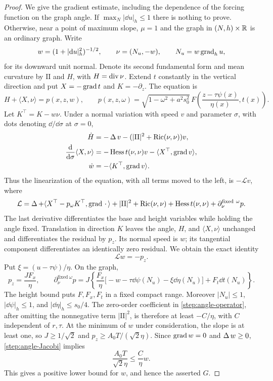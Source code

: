 \begin{proof}
We give the gradient estimate, including the dependence of the forcing function
on the graph angle.  If $\max_N|\dd u|_h\le1$ there is nothing to prove.
Otherwise, near a point of maximum slope, $\mu=1$ and the graph in
$(N,h)\times\mathbb R$ is an ordinary graph.  Write
\[
 w=(1+|\mathrm d u|_h^2)^{-1/2},\qquad
 \nu=(N_u,-w),\qquad N_u=w\operatorname{grad}_hu,
\]
for its downward unit normal.  Denote its second fundamental form and
mean curvature by $\mathrm{II}$ and $H$, with $H=\operatorname{div}\nu$.  Extend
$t$ constantly in the vertical direction and put $X=-\operatorname{grad} t$ and
$K=-\partial_z$.  The equation is
\[
 H+\langle X,\nu\rangle=p(x,z,w),\qquad
 p(x,z,\omega)=\sqrt{1-\omega^2+a^2s_0^2}\,
 F\left(\frac{z-\tau\psi(x)}{\eta(x)},t(x)\right).
\]
Let $K^\top=K-w\nu$.  Under a normal variation with speed $v$ and
parameter $\sigma$, with dots denoting $\dd/\dd\sigma$ at $\sigma=0$,
\begin{align*}
 \dot H&=-\operatorname{\Delta} v-(|\mathrm{II}|^2+\operatorname{Ric}(\nu,\nu))v,\\
 \frac{\mathrm d}{\mathrm d\sigma}\langle X,\nu\rangle
 &=-\operatorname{Hess} t(\nu,\nu)v-\langle X^\top,\operatorname{grad} v\rangle,\\
 \dot w&=-\langle K^\top,\operatorname{grad} v\rangle.
\end{align*}
Thus the linearization of the equation, with all terms moved to the
left, is $-\mathcal Lv$, where
\begin{equation}\label{step:angle-operator}
 \mathcal L=\operatorname{\Delta}+
 \langle X^\top-p_\omega K^\top,\operatorname{grad}\,\cdot\,\rangle
 +|\mathrm{II}|^2+\operatorname{Ric}(\nu,\nu)+\operatorname{Hess} t(\nu,\nu)
 +\partial_\nu^{\mathrm{fixed}\ \omega}p.
\end{equation}
The last derivative differentiates the base and height variables while
holding the angle fixed.  Translation in direction $K$ leaves the angle,
$H$, and $\langle X,\nu\rangle$ unchanged and differentiates the
residual by $p_z$.  Its normal speed is $w$; its tangential component
differentiates an identically zero residual.  We obtain the exact identity
\begin{equation}\label{step:angle-Jacobi}
 \mathcal Lw=-p_z.
\end{equation}
Put $\xi=(u-\tau\psi)/\eta$.  On the graph,
\[
 p_z=\frac{JF_x}{\eta},\qquad
 \partial_\nu^{\mathrm{fixed}\ \omega}p
 =J\left\{
 \frac{F_x}{\eta}\bigl[-w-\tau\dd\psi(N_u)-\xi\dd\eta(N_u)\bigr]
 +F_t\dd t(N_u)\right\}.
\]
The height bound puts $F,F_x,F_t$ in a fixed compact range.  Moreover
$|N_u|\le1$, $|\dd\psi|_h\le1$, and $|\dd\eta|_h\le s_0/4$.
The zero-order coefficient in \cref{step:angle-operator}, after omitting
the nonnegative term $|\mathrm{II}|^2$, is therefore at least $-C/\eta$,
with $C$ independent of $r,\tau$.  At the minimum of $w$ under
consideration, the slope is at least one, so $J\ge1/\sqrt2$ and
$p_z\ge A_0T/(\sqrt2\eta)$.  Since $\operatorname{grad} w=0$ and $\operatorname{\Delta} w\ge0$,
\cref{step:angle-Jacobi} implies
\[
 \frac{A_0T}{\sqrt2\eta}\le\frac C\eta w.
\]
This gives a positive lower bound for $w$, and hence the asserted $G$.


\end{proof}
